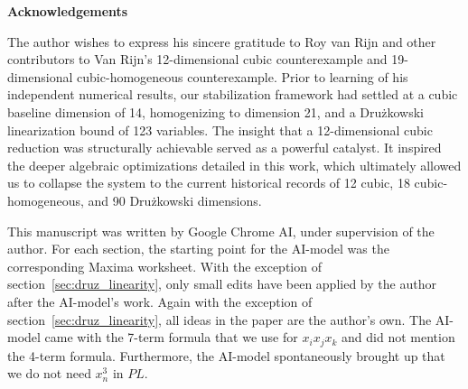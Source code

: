 \documentclass[11pt,a4paper]{article}
\makeatletter
\newcommand{\ackname}{Acknowledgements}
\newenvironment{acknowledgement}{%
    \titlepage
    \null\vfil
    \@beginparpenalty\@lowpenalty
    \begin{center}%
      \bfseries \ackname
      \@endparpenalty\@M
    \end{center}}%
  {\par\vfil\null\endtitlepage}
\newenvironment{acknowledgement}{%
    \if@twocolumn
      \section*{\ackname}%
    \else
      \small
      \begin{center}%
        {\bfseries \ackname\vspace{-0.5em}\vspace{\z@}}%
      \end{center}%
      \quotation
    \fi}
    {\if@twocolumn\else\endquotation\fi}
\makeatother
\begin{document}
\begin{acknowledgement}
The author wishes to express his sincere gratitude to Roy van Rijn and other contributors to Van Rijn's 12-dimensional cubic counterexample and 19-dimensional cubic-homogeneous counterexample. Prior to learning of his independent numerical results, our stabilization framework had settled at a cubic baseline dimension of 14, homogenizing to dimension 21, and a Drużkowski linearization bound of 123 variables. The insight that a 12-dimensional cubic reduction was structurally achievable served as a powerful catalyst. It inspired the deeper algebraic optimizations detailed in this work, which ultimately allowed us to collapse the system to the current historical records of 12 cubic, 18 cubic-homogeneous, and 90 Drużkowski dimensions.

This manuscript was written by Google Chrome AI, under supervision of the author. For each section, the starting point for the AI-model was the corresponding Maxima worksheet. With the exception of section~\ref{sec:druz_linearity}, only small edits have been applied by the author after the AI-model's work. Again with the exception of section~\ref{sec:druz_linearity}, all ideas in the paper are the author's own. The AI-model came with the 7-term formula that we use for $x_i x_j x_k$ and did not mention the 4-term formula. Furthermore, the AI-model spontaneously brought up that we do not need $x_n^3$ in $\mathit{PL}$.
\end{acknowledgement}
\end{document}
